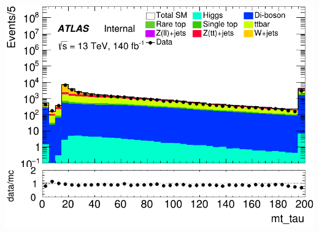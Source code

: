 \documentclass[usenames,dvipsnames]{beamer}
\begin{document}
\begin{frame}
\begin{minipage}{0.32\textwidth}
        \includegraphics[width=\textwidth]{graphics/L_met/L_met_mt_tau.png}
    \end{minipage}
    
    \vspace{0.5cm} %


\end{frame}
\end{document}
